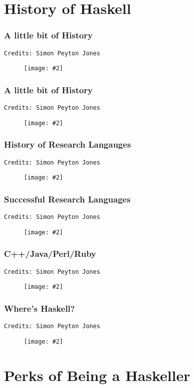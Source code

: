 \documentclass{beamer}
\newenvironment{fimage}[2][\textheight]
               { \begin{figure}
                   \centering
                   \texttt{[image: \#2]}
               }
               { \end{figure} }
\begin{document}
\section{History of Haskell}

\begin{frame}[t]
  \frametitle{A little bit of History}
  \texttt{Credits: Simon Peyton Jones}
  \begin{fimage}[18em]{beginnings} \end{fimage}
\end{frame}

\begin{frame}[t]
  \frametitle{A little bit of History}
  \texttt{Credits: Simon Peyton Jones}
  \begin{fimage}[18em]{haskell98} \end{fimage}
\end{frame}

\begin{frame}[t]
  \frametitle{History of Research Langauges}
  \texttt{Credits: Simon Peyton Jones}
  \begin{fimage}{historyResearchLang} \end{fimage}
\end{frame}

\begin{frame}[t]
  \frametitle{Successful Research Languages}
  \texttt{Credits: Simon Peyton Jones}
  \begin{fimage}{successfulRLang} \end{fimage}
\end{frame}

\begin{frame}[t]
  \frametitle{C++/Java/Perl/Ruby}
  \texttt{Credits: Simon Peyton Jones}
  \begin{fimage}{immortalLanguages} \end{fimage}
\end{frame}

\begin{frame}[t]
  \frametitle{Where's Haskell?}
  \texttt{Credits: Simon Peyton Jones}
  \begin{fimage}[18em]{haskellHistory} \end{fimage}
\end{frame}


\section{Perks of Being a Haskeller}
\end{document}
